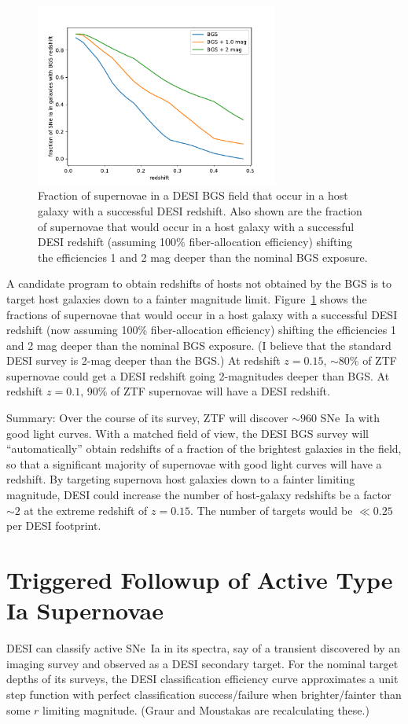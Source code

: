 \documentclass{article}   	%
\begin{document}
\begin{figure}[h]
\includegraphics[width=8cm]{bg_frac.pdf}
\centering
\caption{Fraction of supernovae in a DESI BGS field 
that occur in a host galaxy with a successful DESI redshift.  Also shown are the fraction of supernovae that would occur in a host galaxy
with a successful DESI redshift (assuming 100\% fiber-allocation efficiency) shifting the efficiencies 1 and 2 mag deeper than the nominal BGS exposure.
\label{19.5:fig}}
\end{figure}

A candidate program to obtain redshifts of hosts not obtained by the BGS is to target host galaxies down to a fainter magnitude limit.
Figure~\ref{19.5:fig} shows the fractions of supernovae that would occur in a host galaxy
with a successful DESI redshift (now assuming 100\% fiber-allocation efficiency) shifting the efficiencies 1 and 2 mag deeper than the nominal BGS exposure.
(I believe that the standard DESI survey is 2-mag deeper than the BGS.)
At redshift $z=0.15$,  $\sim 80$\% of ZTF supernovae could get a DESI redshift going 2-magnitudes deeper than BGS.
At redshift $z=0.1$, 90\% of ZTF supernovae will have a DESI redshift.


Summary: Over the course of its survey, ZTF will discover $\sim 960$ SNe~Ia with good light curves.  With a matched field of view,
the DESI BGS survey will ``automatically'' obtain redshifts of a fraction of the brightest galaxies in the field, so that a significant majority
of supernovae with good light curves will have a redshift.   By targeting supernova host galaxies down to a fainter limiting magnitude,
DESI could increase the number of host-galaxy redshifts be a factor $\sim 2$ at the extreme redshift of $z=0.15$.  The number of targets would be
$\ll 0.25$ per DESI footprint.

\section{Triggered Followup of Active Type Ia Supernovae}
DESI can classify active SNe~Ia in its spectra, say of
a transient discovered by an imaging survey and  observed as a DESI secondary target.
For the nominal target depths of its surveys, the DESI classification efficiency curve approximates 
a unit step function with perfect classification success/failure when brighter/fainter than some $r$ limiting magnitude.  (Graur and Moustakas are recalculating these.)
\end{document}
